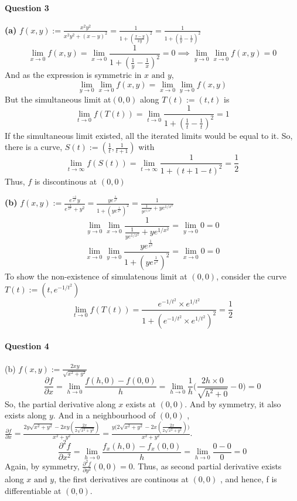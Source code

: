 \documentclass[20pt,a4paper]{extarticle} %
\theoremstyle{definition}
\theoremstyle{definition}
\begin{document}
\paragraph{Question 3}
\textbf{(a)} $f(x,y):=\frac{x^2y^2}{x^2y^2+(x-y)^2}=\frac{1}{1+(\frac{x-y}{xy})^2}=\frac{1}{1+(\frac{1}{y}-\frac{1}{x})^2}$\\
\[ \lim_{x \to 0} f(x,y)=\lim_{x \to 0} \frac{1}{1+(\frac{1}{y}-\frac{1}{x})^2}=0
\implies \lim_{y \to 0}\lim_{x \to 0}f(x,y)=0 \]
And as the expression is symmetric in $x \text{ and } y$,
\[ \lim_{y \to 0}\lim_{x \to 0}f(x,y)=\lim_{x \to 0}\lim_{y \to 0}f(x,y)\]
But the simultaneous limit at$(0,0)$  along $T(t):=(t,t) $ is
\[ \lim_{t \to 0} f(T(t))= \lim_{t \to 0} \frac{1}{1+(\frac{1}{t}-\frac{1}{t})^2}=1 \]
If the simultaneous limit existed, all the iterated limits would be equal to it. So, there is a curve,
$S(t):=(\frac{1}{t},\frac{1}{t+1})$ with
\[ \lim_{t \to \infty} f(S(t)) = \lim_{t \to \infty} \frac{1}{1+(t+1-t)^2}=\frac{1}{2} \]
Thus, $f$ is discontinous at $(0,0)$

\textbf{(b)} $f(x,y):=\frac{e^{\frac{-1}{x^2}}y}{e^{\frac{-1}{x^2}}+y^2}=\frac{ye^{\frac{1}{x^2}}}
{ 1+(ye^{\frac{1}{x^2}})^2}=\frac{1}{ \frac{1}{ye^{1/x^2}}+ye^{1/x^2}} $\\
\[ \lim_{y \to 0} \lim_{x \to 0}\frac{1}{ \frac{1}{ye^{1/x^2}}+ye^{1/x^2}}= \lim_{y \to 0} 0=0  \]
\[ \lim_{x \to 0} \lim_{y \to 0}\frac{ye^{\frac{1}{x^2}}}{ 1+(ye^{\frac{1}{x^2}})^2}=\lim_{x \to 0} 0=0\]
To show the non-existence of simulatenous limit at $(0,0)$, consider the curve $T(t):=(t,e^{-1/t^2})$
\[\lim_{t\to 0}f(T(t))=\frac{e^{-1/t^2}\times e^{1/t^2}}{1+(e^{-1/t^2}\times e^{1/t^2})^2}=\frac{1}{2} \]

\newpage
\paragraph{Question 4}
(b) $f(x,y):= \frac{2xy}{\sqrt{x^2+y^2}}$ \\
\[ \frac{\partial f}{\partial x}=\lim_{h \to 0} \frac{f(h,0)-f(0,0)}{h}=
\lim_{h \to 0} \frac{1}{h} \big( \frac{2h \times 0}{\sqrt{h^2+0}} - 0 \big)=0\]
So, the partial derivative along $x$ exists at $(0,0)$. And by symmetry, it also exists along $y$.
And in a neighbourhood of $(0,0)$ ,
$\frac{\partial f}{\partial x}= \frac{2y\sqrt{x^2+y^2}-2xy(\frac{2x}{2\sqrt{x^2+y^2}})}{x^2+y^2}
=\frac{y\Big( 2\sqrt{x^2+y^2}-2x(\frac{2x}{2\sqrt{x^2+y^2}})\Big)}{x^2+y^2}$.
\[ \frac{\partial^2 f}{\partial x^2}=\lim_{h \to 0} \frac{f_x(h,0)-f_x(0,0)}{h}=
\lim_{h \to 0}\frac{0-0}{0}=0\]
Again, by symmetry, $\frac{\partial^2 f}{\partial y^2}(0,0)=0$. Thus, as second partial derivative
exists along $x \text{ and } y$, the first derivatives are continous at $(0,0)$ , and hence, f is
differentiable at $(0,0)$.\\
\end{document}
